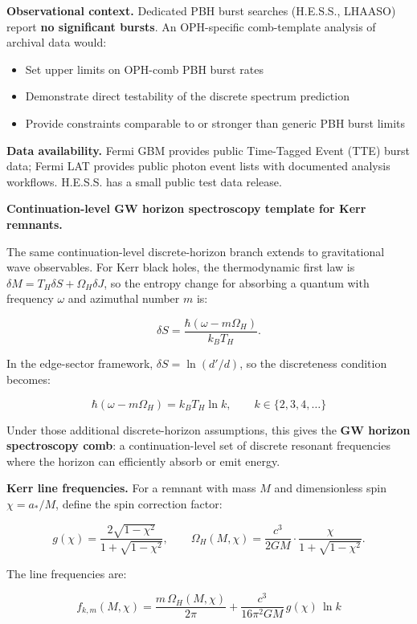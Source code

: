\textbf{Observational context.} Dedicated PBH burst searches (H.E.S.S., LHAASO) report \textbf{no significant bursts}. An OPH-specific comb-template analysis of archival data would:

\begin{itemize}
\tightlist
\item
  Set upper limits on OPH-comb PBH burst rates
\item
  Demonstrate direct testability of the discrete spectrum prediction
\item
  Provide constraints comparable to or stronger than generic PBH burst limits
\end{itemize}

\textbf{Data availability.} Fermi GBM provides public Time-Tagged Event (TTE) burst data; Fermi LAT provides public photon event lists with documented analysis workflows. H.E.S.S. has a small public test data release.

\textbf{Continuation-level GW horizon spectroscopy template for Kerr remnants.}

The same continuation-level discrete-horizon branch extends to gravitational wave observables. For Kerr black holes, the thermodynamic first law is \(\delta M = T_H \delta S +
\Omega_H \delta J\), so the entropy change for absorbing a quantum with frequency \(\omega\) and azimuthal number \(m\) is:

\[
\delta S = \frac{\hbar(\omega - m\Omega_H)}{k_B T_H}.
\]

In the edge-sector framework, \(\delta S = \ln(d'/d)\), so the discreteness condition becomes:

\[
\hbar(\omega - m\Omega_H) = k_B T_H \ln k, \qquad k \in \{2, 3, 4, \ldots\}
\]

Under those additional discrete-horizon assumptions, this gives the \textbf{GW horizon spectroscopy comb}: a continuation-level set of discrete resonant frequencies where the horizon can efficiently absorb or emit energy.

\textbf{Kerr line frequencies.} For a remnant with mass \(M\) and dimensionless spin \(\chi = a_*/M\), define the spin correction factor:

\[
g(\chi) = \frac{2\sqrt{1-\chi^2}}{1+\sqrt{1-\chi^2}}, \qquad
\Omega_H(M,\chi) = \frac{c^3}{2GM} \cdot \frac{\chi}{1+\sqrt{1-\chi^2}}.
\]

The line frequencies are:

\[
f_{k,m}(M,\chi) = \frac{m \, \Omega_H(M,\chi)}{2\pi} + \frac{c^3}{16\pi^2 GM} \, g(\chi) \, \ln k
\]

